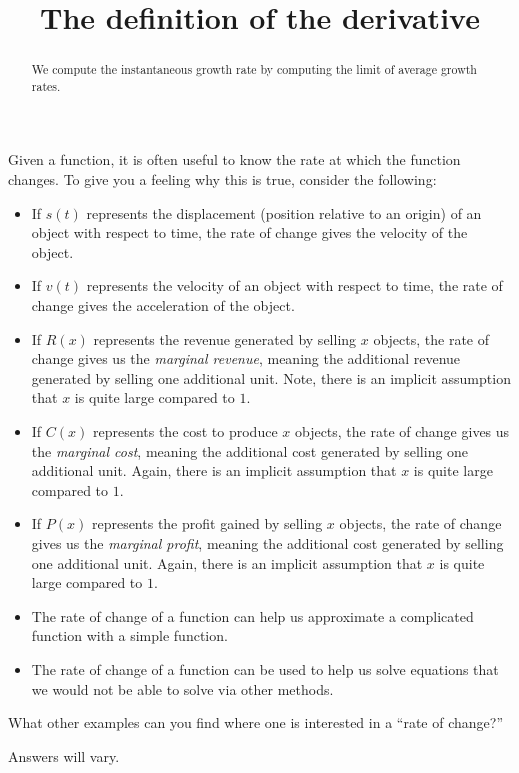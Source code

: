 \PassOptionsToClass{tikzexport}{ximera}\nonstopmode\documentclass{ximera}
\title[Dig-In:]{The definition of the derivative}
\begin{document}
\begin{abstract}
We compute the instantaneous growth rate by computing the limit of
average growth rates.
\end{abstract}
\maketitle


Given a function, it is often useful to know the rate at which the
function changes. To give you a feeling why this is true, consider the
following:
\begin{itemize}
\item If $s(t)$ represents the displacement (position relative to an
  origin) of an object with respect to time, the rate of change gives
  the velocity of the object.
\item If $v(t)$ represents the velocity of an object with respect to
  time, the rate of change gives the acceleration of the object.
\item If $R(x)$ represents the revenue generated by selling $x$
  objects, the rate of change gives us the \textit{marginal revenue},
  meaning the additional revenue generated by selling one additional
  unit. Note, there is an implicit assumption that $x$ is quite large
  compared to $1$.
\item If $C(x)$ represents the cost to produce $x$ objects, the rate
  of change gives us the \textit{marginal cost}, meaning the
  additional cost generated by selling one additional unit. Again,
  there is an implicit assumption that $x$ is quite large compared to
  $1$.
\item If $P(x)$ represents the profit gained by selling $x$ objects,
  the rate of change gives us the \textit{marginal profit}, meaning
  the additional cost generated by selling one additional unit. Again,
  there is an implicit assumption that $x$ is quite large compared to
  $1$.
\item The rate of change of a function can help us approximate a
  complicated function with a simple function.
\item The rate of change of a function can be used to help us solve
  equations that we would not be able to solve via other methods.
\end{itemize}

\begin{xarmaBoost}
What other examples can you find where one is interested in a ``rate
of change?''
\begin{freeResponse}
Answers will vary.
\end{freeResponse}
\end{xarmaBoost}
\end{document}
